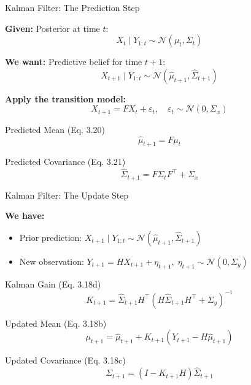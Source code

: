 \documentclass[handout,aspectratio=169]{beamer}
\begin{document}
\begin{frame}{Kalman Filter: The Prediction Step}

\textbf{Given:} Posterior at time \( t \):
\[
X_t \mid Y_{1:t} \sim \mathcal{N}(\mu_t, \Sigma_t)
\]

\textbf{We want:} Predictive belief for time \( t+1 \):
\[
X_{t+1} \mid Y_{1:t} \sim \mathcal{N}(\hat{\mu}_{t+1}, \hat{\Sigma}_{t+1})
\]

\textbf{Apply the transition model:}
\[
X_{t+1} = F X_t + \varepsilon_t, \quad \varepsilon_t \sim \mathcal{N}(0, \Sigma_x)
\]

\begin{block}{Predicted Mean (Eq. 3.20)}
\[
\hat{\mu}_{t+1} = F \mu_t
\]
\end{block}

\begin{block}{Predicted Covariance (Eq. 3.21)}
\[
\hat{\Sigma}_{t+1} = F \Sigma_t F^\top + \Sigma_x
\]
\end{block}
\end{frame}

\begin{frame}{Kalman Filter: The Update Step}

\textbf{We have:}
\begin{itemize}
  \item Prior prediction: \( X_{t+1} \mid Y_{1:t} \sim \mathcal{N}(\hat{\mu}_{t+1}, \hat{\Sigma}_{t+1}) \)
  \item New observation: \( Y_{t+1} = H X_{t+1} + \eta_{t+1}, \; \eta_{t+1} \sim \mathcal{N}(0, \Sigma_y) \)
\end{itemize}

\begin{block}{Kalman Gain (Eq. 3.18d)}
\[
K_{t+1} = \hat{\Sigma}_{t+1} H^\top \left( H \hat{\Sigma}_{t+1} H^\top + \Sigma_y \right)^{-1}
\]
\end{block}

\begin{block}{Updated Mean (Eq. 3.18b)}
\[
\mu_{t+1} = \hat{\mu}_{t+1} + K_{t+1} \left( Y_{t+1} - H \hat{\mu}_{t+1} \right)
\]
\end{block}

\begin{block}{Updated Covariance (Eq. 3.18c)}
\[
\Sigma_{t+1} = \left( I - K_{t+1} H \right) \hat{\Sigma}_{t+1}
\]
\end{block}

\end{frame}
\end{document}
